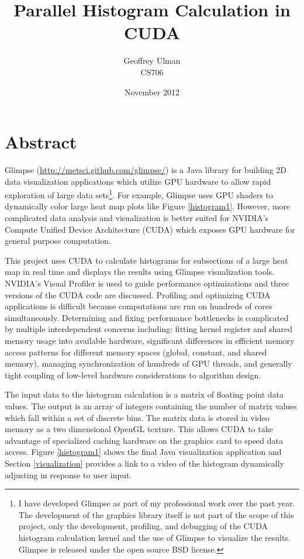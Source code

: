 \documentclass{article}
\begin{document}
\title{Parallel Histogram Calculation in CUDA}
\author{Geoffrey Ulman\\
        CS706}
\date{November 2012}
\maketitle

\section{Abstract}\label{abstract}

Glimpse (\url{http://metsci.github.com/glimpse/}) is a Java library for building 2D data visualization applications which utilize GPU hardware to allow rapid exploration of large data sets\footnote{I have developed Glimpse as part of my professional work over the past year. The development of the graphics library itself is not part of the scope of this project, only the development, profiling, and debugging of the CUDA histogram calculation kernel and the use of Glimpse to visualize the results. Glimpse is released under the open source BSD license.}. For example, Glimpse uses GPU shaders to dynamically color large heat map plots like Figure \ref{histogram1}. However, more complicated data analysis and visualization is better suited for NVIDIA's Compute Unified Device Architecture (CUDA) which exposes GPU hardware for general purpose computation\cite{cuda-zone}.

This project uses CUDA to calculate histograms for subsections of a large heat map in real time and displays the results using Glimpse visualization tools. NVIDIA's Visual Profiler\cite{nvidia-visual-profiler} is used to guide performance optimizations and three versions of the CUDA code are discussed. Profiling and optimizing CUDA applications is difficult because computations are run on hundreds of cores simultaneously. Determining and fixing performance bottlenecks is complicated by multiple interdependent concerns including: fitting kernel register and shared memory usage into available hardware, significant differences in efficient memory access patterns for different memory spaces (global, constant, and shared memory), managing synchronization of hundreds of GPU threads, and generally tight coupling of low-level hardware considerations to algorithm design.

The input data to the histogram calculation is a matrix of floating point data values. The output is an array of integers containing the number of matrix values which fall within a set of discrete bins. The matrix data is stored in video memory as a two dimensional OpenGL texture. This allows CUDA to take advantage of specialized caching hardware on the graphics card to speed data access. Figure \ref{histogram1} shows the final Java visualization application and Section \ref{visualization} provides a link to a video of the histogram dynamically adjusting in response to user input.
\end{document}
